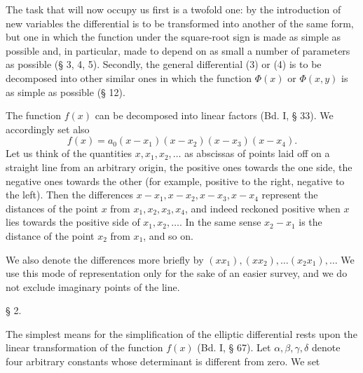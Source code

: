 The task that will now occupy us first is a twofold one: by the introduction of new variables the differential
is to be transformed into another of the same form, but one in which the function under the square-root sign is made as simple as possible and, in particular, made to depend on as small a number of parameters as possible (§ 3, 4, 5). Secondly, the general differential (3) or (4) is to be decomposed into other similar ones in which the function $\Phi(x)$ or $\Phi(x,y)$ is as simple as possible (§ 12).

The function $f(x)$ can be decomposed into linear factors (Bd. I, § 33). We accordingly set also
\[
f(x) = a_0(x-x_1)(x-x_2)(x-x_3)(x-x_4).
\]
Let us think of the quantities $x, x_1, x_2, \ldots$ as abscissas of points laid off on a straight line from an arbitrary origin, the positive ones towards the one side, the negative ones towards the other (for example, positive to the right, negative to the left). Then the differences $x-x_1, x-x_2, x-x_3, x-x_4$ represent the distances of the point $x$ from $x_1, x_2, x_3, x_4$, and indeed reckoned positive when $x$ lies towards the positive side of $x_1, x_2, \ldots$. In the same sense $x_2-x_1$ is the distance of the point $x_2$ from $x_1$, and so on.

We also denote the differences more briefly by $(xx_1), (xx_2), \ldots (x_2x_1), \ldots$ We use this mode of representation only for the sake of an easier survey, and we do not exclude imaginary points of the line.

§ 2. 

The simplest means for the simplification of the elliptic differential rests upon the linear transformation of the function $f(x)$ (Bd. I, § 67). Let $\alpha, \beta, \gamma, \delta$ denote four arbitrary constants whose determinant
is different from zero. We set
